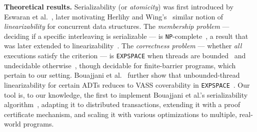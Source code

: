 
\smallskip
\noindent
\textbf{Theoretical results.}
Serializability (or \emph{atomicity}) was
first introduced by Eswaran et al.~\cite{EsGrKoTr76},
later motivating Herlihy and Wing's~\cite{HeWe87,HeWi90} similar notion of \emph{linearizability} for concurrent data structures. 
%
The \emph{membership problem} --- deciding if a specific interleaving is serializable --- is \texttt{NP}-complete~\cite{Pa79}, a result that was later extended to
linearizability~\cite{GiKo97}. 
The \emph{correctness problem} --- whether \emph{all} executions satisfy the criterion --- is \texttt{EXPSPACE} when threads are bounded~\cite{AlMcPe96} and undecidable otherwise~\cite{BoEmEnHa13}, though decidable for finite-barrier programs, which pertain to our setting. Bouajjani et al.~\cite{BoEmEnHa18} further show that unbounded-thread linearizability for certain ADTs reduces to VASS coverability in \texttt{EXPSPACE}~\cite{Ra78}. Our tool is, to our knowledge, the first to implement Bouajjani et al.’s serializability algorithm~\cite{BoEmEnHa13}, adapting it to distributed transactions, extending it with a proof certificate mechanism, and scaling it with various optimizations to multiple, real-world programs. 

